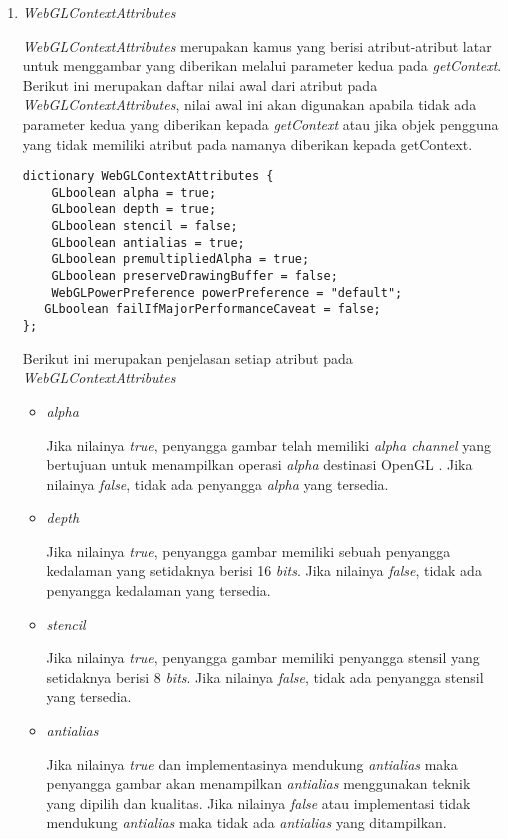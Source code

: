 \documentclass[a4paper,twoside]{article}
\begin{document}
\begin{enumerate}
\begin{enumerate}
\item {\it WebGLContextAttributes}

	{\it WebGLContextAttributes} merupakan kamus yang berisi atribut-atribut latar untuk menggambar yang diberikan melalui parameter kedua pada {\it getContext}. Berikut ini merupakan daftar nilai awal dari atribut pada {\it WebGLContextAttributes}, nilai awal ini akan digunakan apabila tidak ada parameter kedua yang diberikan kepada {\it getContext} atau jika objek pengguna yang tidak memiliki atribut pada namanya diberikan kepada getContext. 
	\begin{lstlisting}[caption={Nilai awal pada {\it WebGLContextAttributes} saat tidak ada parameter kedua yang diberikan.}, captionpos=b]
dictionary WebGLContextAttributes {
    GLboolean alpha = true;
    GLboolean depth = true;
    GLboolean stencil = false;
    GLboolean antialias = true;
    GLboolean premultipliedAlpha = true;
    GLboolean preserveDrawingBuffer = false;
    WebGLPowerPreference powerPreference = "default";
   GLboolean failIfMajorPerformanceCaveat = false;
};
	\end{lstlisting}
	Berikut ini merupakan penjelasan setiap atribut pada {\it WebGLContextAttributes} 
	\begin{itemize}
	\item {\it alpha}
	
	Jika nilainya {\it true}, penyangga gambar telah memiliki {\it alpha channel} yang bertujuan untuk menampilkan operasi {\it alpha} destinasi OpenGL . Jika nilainya {\it false}, tidak ada penyangga {\it alpha} yang tersedia.
	
	\item {\it depth}
	
	Jika nilainya {\it true}, penyangga gambar memiliki sebuah penyangga kedalaman yang setidaknya berisi 16 {\it bits}. Jika nilainya {\it false}, tidak ada penyangga kedalaman yang tersedia.
	
	\item {\it stencil}
	
	Jika nilainya {\it true}, penyangga gambar memiliki penyangga stensil yang setidaknya berisi 8 {\it bits}. Jika nilainya {\it false}, tidak ada penyangga stensil yang tersedia.
	
	\item {\it antialias}
	
	Jika nilainya {\it true} dan implementasinya mendukung {\it antialias} maka penyangga gambar akan menampilkan {\it antialias} menggunakan teknik yang dipilih dan kualitas. Jika nilainya {\it false} atau implementasi tidak mendukung {\it antialias} maka tidak ada {\it antialias} yang ditampilkan.
	

\end{itemize}
\end{enumerate}
\end{enumerate}
\end{document}
